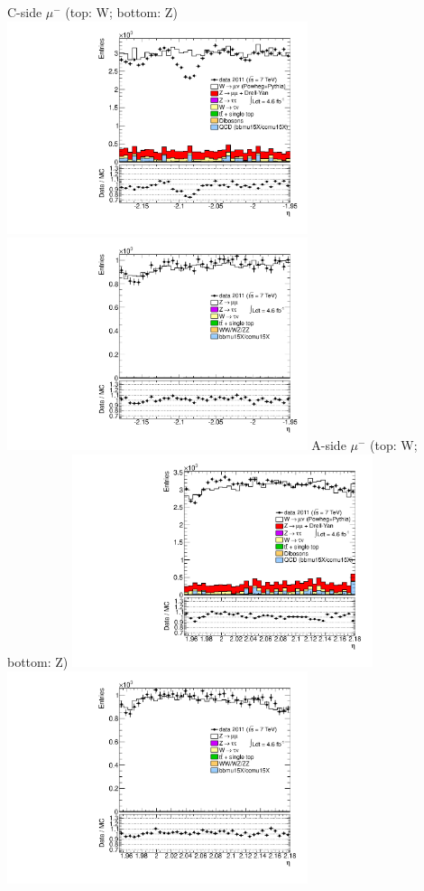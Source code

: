  {
\colb[T]
C-side $\mu^{-}$ (top: W; bottom: Z)
\centering
\includegraphics[width=0.66\textwidth]{dates/20130306/figures/avgmu/Wavgmu7_10_10_C_stack_l_eta_NEG} \\
\includegraphics[width=0.66\textwidth]{dates/20130306/figures/both/Z_10_C_stack_lN_eta_ALL.pdf}
A-side $\mu^{-}$ (top: W; bottom: Z)
\centering
\includegraphics[width=0.66\textwidth]{dates/20130306/figures/avgmu/Wavgmu7_10_10_A_stack_l_eta_NEG} \\
\includegraphics[width=0.66\textwidth]{dates/20130306/figures/both/Z_10_A_stack_lN_eta_ALL.pdf} 
\cole
}

